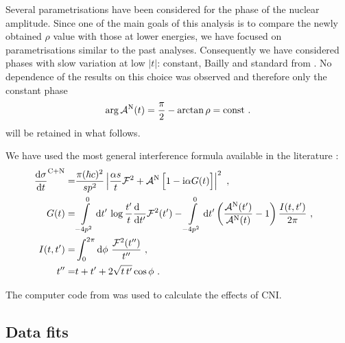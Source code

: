 Several parametrisations have been considered for the phase of the nuclear amplitude. Since one of the main goals of this analysis is to compare the newly obtained $\rho$ value with those at lower energies, we have focused on parametrisations similar to the past analyses. Consequently we have considered phases with slow variation at low $|t|$: constant, Bailly and standard from \cite{totem-8tev-1km}. No dependence of the results on this choice was observed and therefore only the constant phase
\begin{equation}
\label{eq:nuc phase con}
\arg {\cal A}^{\rm N}(t) = {\pi\over 2} - \arctan\rho = \hbox{const} \ .
\end{equation}
will be retained in what follows. 

We have used the most general interference formula available in the literature \cite{kl94}:
\begin{equation}
\label{eq:int kl}
	\begin{aligned}
		{\d\sigma\over \d t}^{\rm C+N} =& {\pi (\hbar c)^2 \over s p^2} \left | {\alpha s\over t} {\cal F}^2
			+ {\cal A}^{\rm N}\, \Big[1 - \I\alpha G(t)\Big] \right |^2\ ,\cr
		G(t) =& \int\limits_{-4p^2}^0 \d t'\, \log {t'\over t} {\d\phantom{t'}\over \d t'} {\cal F}^2(t')
			  - \int\limits_{-4p^2}^0 \d t' \left( {{\cal A}^{\rm N}(t') \over {\cal A}^{\rm N}(t)} - 1 \right) { I(t, t')\over 2\pi }\ , \cr
		I(t, t') =& \int_0^{2\pi} \d\phi\ {{\cal F}^2(t'')\over t''}\ ,\cr
		t'' =& t + t' + 2\sqrt{t\, t'} \cos\phi\ .\cr
	\end{aligned}
\end{equation}

The computer code from \cite{elegent} was used to calculate the effects of CNI.


\subsection{Data fits}
\label{sec:rho anal}

